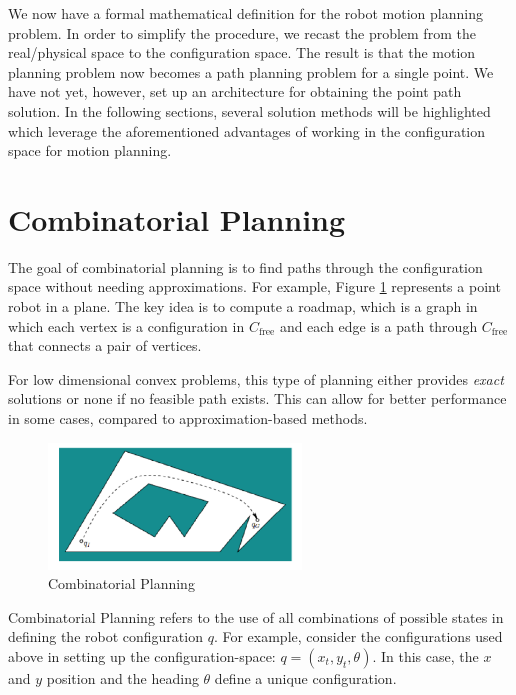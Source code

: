 \documentclass[twoside]{article}
\begin{document}
We now have a formal mathematical definition for the robot motion planning problem. In order to simplify the procedure, we recast the problem from the real/physical space to the configuration space. The result is that the motion planning problem now becomes a path planning problem for a single point. We have not yet, however, set up an architecture for obtaining the point path solution. In the following sections, several solution methods will be highlighted which leverage the aforementioned advantages of working in the configuration space for motion planning.

\section{Combinatorial Planning}
The goal of combinatorial planning is to find paths through the configuration space without needing approximations. For example, Figure \ref{fig:15_4} represents a point robot in a plane. The key idea is to compute a roadmap, which is a graph in which each vertex is a configuration in $C_\text{free}$ and each edge is a path through $C_\text{free}$ that connects a pair of vertices.

For low dimensional convex problems, this type of planning either provides \textit{exact} solutions or none if no feasible path exists. This can allow for better performance in some cases, compared to approximation-based methods.

\begin{figure}[H]
\begin{center}
\includegraphics[width=0.6\textwidth]{fig15_4.PNG}
\caption{Combinatorial Planning}
\label{fig:15_4}
\end{center}
\end{figure}

Combinatorial Planning refers to the use of all combinations of possible states in defining the robot configuration $q$. For example, consider the configurations used above in setting up the configuration-space: $q = (x_t, y_t, \theta)$. In this case, the $x$ and $y$ position and the heading $\theta$ define a unique configuration.
\end{document}
